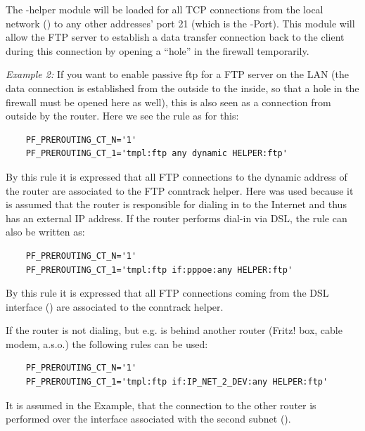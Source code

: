   The -helper module will be loaded for all TCP connections from the
  local network () to any other addresses' port 21 (which is the
  -Port). This module will allow the FTP server to establish a data
  transfer connection back to the client during this connection by opening a ``hole''
  in the firewall temporarily.

  \emph{Example 2:} If you want to enable passive ftp for a FTP server on the LAN
  (the data connection is established from the outside to the inside, so
  that a hole in the firewall must be opened here as well), this is also seen
  as a connection from outside by the router. Here we see the rule as for this:

\begin{example}
\begin{verbatim}
    PF_PREROUTING_CT_N='1'
    PF_PREROUTING_CT_1='tmpl:ftp any dynamic HELPER:ftp'
\end{verbatim}
\end{example}

  By this rule it is expressed that all FTP connections to the dynamic address
  of the router are associated to the FTP conntrack helper. Here 
  was used because it is assumed that the router is responsible for dialing in to
  the Internet and thus has an external IP address. If the router performs dial-in
  via DSL, the rule can also be written as:

\begin{example}
\begin{verbatim}
    PF_PREROUTING_CT_N='1'
    PF_PREROUTING_CT_1='tmpl:ftp if:pppoe:any HELPER:ftp'
\end{verbatim}
\end{example}

  By this rule it is expressed that all FTP connections coming from the DSL
  interface () are associated to the conntrack helper.

  If the router is not dialing, but e.g. is behind another router (Fritz! box,
  cable modem, a.s.o.) the following rules can be used:

\begin{example}
\begin{verbatim}
    PF_PREROUTING_CT_N='1'
    PF_PREROUTING_CT_1='tmpl:ftp if:IP_NET_2_DEV:any HELPER:ftp'
\end{verbatim}
\end{example}

  It is assumed in the Example, that the connection to the other router
  is performed over the interface associated with the second subnet
  ().

